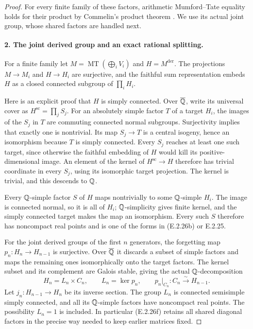 \begin{proof}
For every finite family of these factors, arithmetic
Mumford--Tate equality holds for their product by Commelin's
product theorem
\cite[Theorem 10.5, p.~676]{GenCommelin2019}.
We use its actual joint group, whose shared factors are handled
next.

\paragraph{2. The joint derived group and an exact rational splitting.}
For a finite family let
\(M=\operatorname{MT}(\bigoplus_iV_i)\) and \(H=M^{\mathrm{der}}\).
The projections \(M\to M_i\) and \(H\to H_i\) are surjective,
and the faithful sum representation embeds \(H\) as a closed
connected subgroup of \(\prod_iH_i\).

Here is an explicit proof that \(H\) is simply connected.
Over \(\overline{\mathbb Q}\), write its universal cover as
\(H^{\mathrm{sc}}=\prod_jS_j\). For an absolutely simple
factor \(T\) of a target \(H_i\), the images of the \(S_j\)
in \(T\) are commuting connected normal subgroups. Surjectivity
implies that exactly one is nontrivial. Its map \(S_j\to T\)
is a central isogeny, hence an isomorphism because \(T\) is
simply connected. Every \(S_j\) reaches at least one such
target, since otherwise the faithful embedding of \(H\) would
kill its positive-dimensional image. An element of the kernel
of \(H^{\mathrm{sc}}\to H\) therefore has trivial coordinate
in every \(S_j\), using its isomorphic target projection.
The kernel is trivial, and this descends to \(\mathbb Q\).

Every \(\mathbb Q\)-simple factor \(S\) of \(H\) maps nontrivially
to some \(\mathbb Q\)-simple \(H_i\). The image is connected normal,
so it is all of \(H_i\); \(\mathbb Q\)-simplicity gives finite
kernel, and the simply connected target makes the map an
isomorphism. Every such \(S\) therefore has noncompact real
points and is one of the forms in (E.2.26b) or E.2.25.

For the joint derived groups of the first \(n\) generators,
the forgetting map \(p_n:H_n\to H_{n-1}\) is surjective.
Over \(\overline{\mathbb Q}\) it discards a subset of simple factors and maps
the remaining ones isomorphically onto the target factors.
The kernel subset and its complement are Galois stable, giving
the actual \(\mathbb Q\)-decomposition
\[
 H_n=L_n\times C_n,\qquad L_n=\ker p_n,
 \qquad p_n|_{C_n}:C_n\xrightarrow{\sim}H_{n-1}.
 \tag{E.2.26f}
\]
Let \(j_n:H_{n-1}\to H_n\) be its inverse section.
The group \(L_n\) is connected semisimple simply connected,
and all its \(\mathbb Q\)-simple factors have noncompact real points.
The possibility \(L_n=1\) is included. In particular (E.2.26f)
retains all shared diagonal factors in the precise way needed
to keep earlier matrices fixed.


\end{proof}
